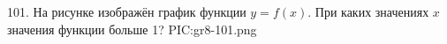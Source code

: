101. На рисунке изображён график функции $y=f(x).$ При каких значениях $x$ значения функции больше 1?
{{PIC:gr8-101.png}}\\
